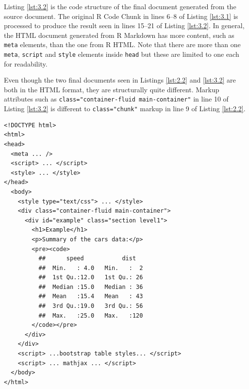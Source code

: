 \documentclass[a4paper, 12pt]{report}
\begin{document}
Listing \ref{lst:3.2} is the code structure of the final document generated from the source document. The original R Code Chunk in lines 6--8 of Listing \ref{lst:3.1} is processed to produce the result seen in lines 15--21 of Listing \ref{lst:3.2}. In general, the HTML document generated from R Markdown has more content, such as \texttt{meta} elements, than the one from R HTML. Note that there are more than one \texttt{meta}, \texttt{script} and \texttt{style} elements inside \texttt{head} but these are limited to one each for readability.

Even though the two final documents seen in Listings \ref{lst:2.2} and \ref{lst:3.2} are both in the HTML format, they are structurally quite different. Markup attributes such as \texttt{class="container-fluid main-container"} in line 10 of Listing \ref{lst:3.2} is different to \texttt{class="chunk"} markup in line 9 of Listing \ref{lst:2.2}.
\begin{lstlisting}[caption={(tidied) \texttt{example2.html}}, escapechar=\|, label={lst:3.2}]
<!DOCTYPE html>
<html>
<head>
  <meta ... />
  <script> ... </script>
  <style> ... </style>
</head>
  <body>
    <style type="text/css"> ... </style>
    <div class="container-fluid main-container">
      <div id="example" class="section level1">
        <h1>Example</h1>
        <p>Summary of the cars data:</p>
        <pre><code>
          ##      speed           dist    
    	  ##  Min.   : 4.0   Min.   :  2  
    	  ##  1st Qu.:12.0   1st Qu.: 26  
    	  ##  Median :15.0   Median : 36  
    	  ##  Mean   :15.4   Mean   : 43  
    	  ##  3rd Qu.:19.0   3rd Qu.: 56  
    	  ##  Max.   :25.0   Max.   :120
    	</code></pre>
      </div>
    </div>
    <script> ...bootstrap table styles... </script>
    <script> ... mathjax ... </script>    
  </body>
</html>
\end{lstlisting}
\end{document}
